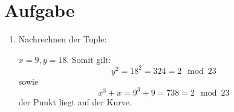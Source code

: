 \documentclass[DIN, pagenumber=false, fontsize=11pt, parskip=half]{scrartcl}
\begin{document}
    \section{Aufgabe}
    \begin{enumerate}[label=\alph*)]
        \item Nachrechnen der Tuple:
        
            $x=9, y=18$. Somit gilt:
            \begin{equation}
                y^2 = 18^2 = 324 = 2 \mod 23
            \end{equation}
            sowie
            \begin{equation}
                x^3 + x = 9^3 + 9 = 738 = 2 \mod 23
            \end{equation}
            der Punkt liegt auf der Kurve.


\end{enumerate}
\end{document}
